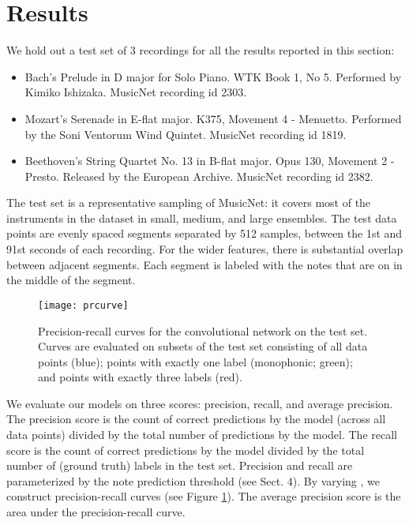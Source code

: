\documentclass{article} \usepackage{iclr2017_conference,times}
\begin{document}
 \section{Results}

We hold out a test set of 3 recordings for all the results reported in this section:
\begin{itemize}[itemsep=0pt,topsep=0pt,parsep=0pt,partopsep=0pt]
\item Bach's Prelude in D major for Solo Piano. WTK Book 1, No 5. Performed by Kimiko Ishizaka. MusicNet recording id 2303.
\item Mozart's Serenade in E-flat major. K375, Movement 4 - Menuetto. Performed by the Soni Ventorum Wind Quintet. MusicNet recording id 1819.
\item Beethoven's String Quartet No. 13 in B-flat major. Opus 130, Movement 2 - Presto. Released by the European Archive. MusicNet recording id 2382.
\end{itemize}

The test set is a representative sampling of MusicNet: it covers most of the instruments in the dataset in small, medium, and large ensembles.  The test data points are evenly spaced segments separated by 512 samples, between the 1st and 91st seconds of each recording. For the wider features, there is substantial overlap between adjacent segments. Each segment is labeled with the notes that are on in the middle of the segment.

\begin{figure}[h]
  \centering
  \texttt{[image: prcurve]}
  \caption{Precision-recall curves for the convolutional network on the test set. Curves are evaluated on subsets of the test set consisting of all data points (blue); points with exactly one label (monophonic; green); and points with exactly three labels (red).}
  \label{pr_curve}
\end{figure}

We evaluate our models on three scores: precision, recall, and average precision. The precision score is the count of correct predictions by the model (across all data points) divided by the total number of predictions by the model. The recall score is the count of correct predictions by the model divided by the total number of (ground truth) labels in the test set. Precision and recall are parameterized by the note prediction threshold  (see Sect. 4). By varying , we construct precision-recall curves (see Figure \ref{pr_curve}). The average precision score is the area under the precision-recall curve.
\end{document}
